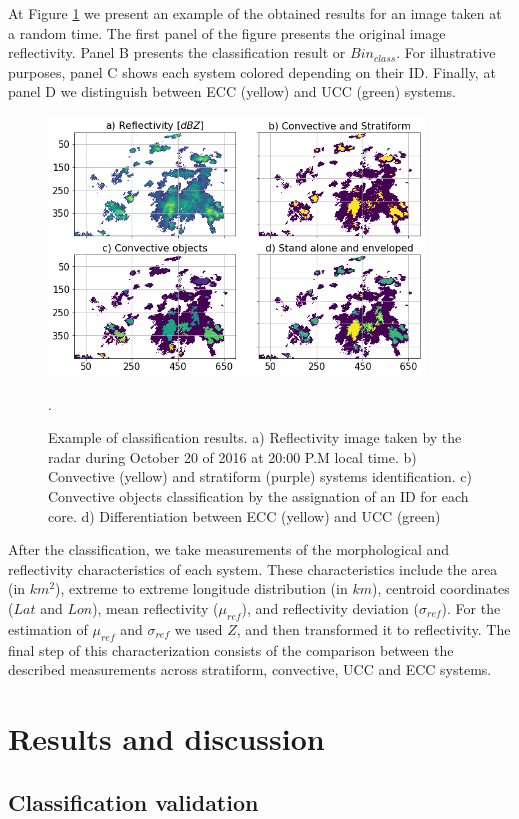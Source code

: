 \documentclass[preprint,12pt]{elsarticle}
\begin{document}
At Figure \ref{fig:SystemClassExample} we present an example of the obtained results for an image taken at a random time. The first panel of the figure presents the original image reflectivity.  Panel B presents the  \citet{Steiner1995} classification result or $Bin_{class}$.  For illustrative purposes, panel C shows each system colored depending on their ID. Finally, at panel D we distinguish between ECC (yellow) and UCC (green) systems. 
\begin{figure}[!h]
    \centering
    \includegraphics[width=10cm]{Figuras/SystemClass_example.png}
    \caption{Example of classification results.  a) Reflectivity image taken by the radar during October 20 of 2016 at 20:00 P.M local time. b) Convective (yellow) and stratiform (purple) systems identification. c) Convective objects classification by the assignation of an ID for each core. d) Differentiation between ECC (yellow) and UCC  (green)}.
    \label{fig:SystemClassExample}
\end{figure}
After the classification, we take measurements of the morphological and reflectivity characteristics of each system.  These characteristics include the area (in $km^2$), extreme to extreme longitude distribution (in $km$), centroid coordinates ($Lat$ and $Lon$), mean reflectivity ($\mu_{ref}$), and reflectivity deviation ($\sigma_{ref}$). For the estimation of $\mu_{ref}$ and $\sigma_{ref}$ we used $Z$, and then transformed it to reflectivity.  The final step of this characterization consists of the comparison between the described measurements across stratiform, convective, UCC and ECC systems.\\  


\section{Results and discussion}\label{sec:results}
\subsection{Classification validation }
\label{sub:validation}
\end{document}
